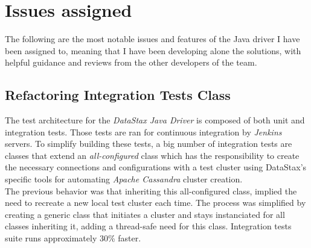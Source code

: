 \documentclass[a4paper]{report}
\newcommand{\djd}{\emph{DataStax Java Driver\xspace}}
\newcommand{\ca}{\emph{Apache Cassandra\xspace}}
\begin{document}
\newpage
\section{Issues assigned}

The following are the most notable issues and features of the Java driver I have been assigned to, meaning that I have been developing alone the solutions, with helpful guidance and reviews from the other developers of the team.

\subsection{Refactoring Integration Tests Class}
The test architecture for the \djd{} is composed of both unit and integration tests. Those tests are ran for continuous integration by \emph{Jenkins} servers. To simplify building these tests, a big number of integration tests are classes that extend an \emph{all-configured} class which has the responsibility to create the necessary connections and configurations with a test cluster using DataStax's specific tools for automating \ca{} cluster creation.\\
The previous behavior was that inheriting this all-configured class, implied the need to recreate a new local test cluster each time. The process was simplified by creating a generic class that initiates a cluster and stays instanciated for all classes inheriting it, adding a thread-safe need for this class. Integration tests suite runs approximately 30\% faster.
\end{document}
